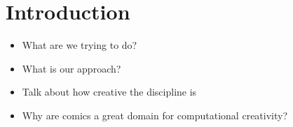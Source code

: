 \section{Introduction}

\begin{itemize}

	\item What are we trying to do?
	\item What is our approach?
	\item Talk about how creative the discipline is
	\item Why are comics a great domain for computational creativity?

\end{itemize}